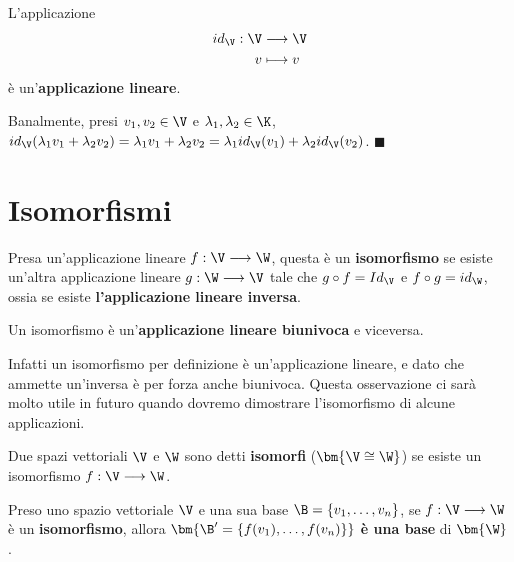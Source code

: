 \documentclass[11pt, a4paper, titlepage, oneside]{scrbook}
\begin{document}
\begin{Osservazione}[]
\label{oss-id-app-lin}
L'applicazione
\vspace{-15pt}
\begin{align*}
id_\V : \V &\longrightarrow \V \\
v &\longmapsto v 
\end{align*}
è un'\textbf{applicazione lineare}.
\end{Osservazione}

\Dimostrazione \nopagebreak

Banalmente, presi $v_1, v_2 \in \V$ e $\lambda_1, \lambda_2 \in \K$, \mbox{$id_\V(\lambda_1 v_1 + \lambda_2 v_2) = \lambda_1 v_1 + \lambda_2 v_2 = \lambda_1 id_\V(v_1) + \lambda_2 id_\V(v_2)$}. $\blacksquare$

\section{Isomorfismi}

\begin{Definizione}[Isomorfismo]
\label{def-isomorfismo}
Presa un'applicazione lineare $f: \V \longrightarrow \W$, questa è un \textbf{isomorfismo} se esiste un'altra applicazione lineare $g: \W \longrightarrow \V$ tale che $g \circ f = Id_\V$ e $f \circ g = id_\W$, ossia se esiste \textbf{l'applicazione lineare inversa}.
\end{Definizione}

\begin{Osservazione}[]
\label{oss-def-isomorfismo}
Un isomorfismo è un'\textbf{applicazione lineare biunivoca} e viceversa.
\end{Osservazione}

Infatti un isomorfismo per definizione è un'applicazione lineare, e dato che ammette un'inversa è per forza anche biunivoca. Questa osservazione ci sarà molto utile in futuro quando dovremo dimostrare l'isomorfismo di alcune applicazioni. 

\begin{Definizione}[Isomorfi]
\label{def-isomorfi}
Due spazi vettoriali $\V$ e $\W$ sono detti \textbf{isomorfi} ($\bm{\V \cong \W}$) se esiste un isomorfismo $f: \V \longrightarrow \W$.
\end{Definizione}

\begin{Osservazione}[]
\label{oss-basi-isomorfismi}
Preso uno spazio vettoriale $\V$ e una sua base $\B = \{v_1, \ldots, v_n\}$, se $f: \V \longrightarrow \W$ è un \textbf{isomorfismo}, allora $\bm{\B' = \{f(v_1), \ldots, f(v_n)\}}$ \textbf{è una base} di $\bm{\W}$.
\end{Osservazione}
\end{document}

